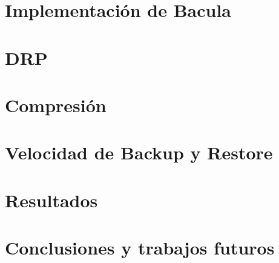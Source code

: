\documentclass[12pt,a4paper]{article}
\begin{document}
\newpage

\section{Implementación de Bacula}                                












\newpage


\section{DRP}






\section{Compresión}


\section{Velocidad de Backup y Restore }





%
%
%
%

\section{Resultados}



\section{Conclusiones y trabajos futuros}

\end{document}
